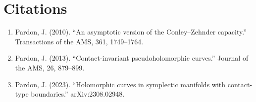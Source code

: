 \section{Citations}

\begin{enumerate}
\item Pardon, J. (2010). ``An asymptotic version of the Conley--Zehnder capacity.'' Transactions of the AMS, 361, 1749--1764.
\item Pardon, J. (2013). ``Contact-invariant pseudoholomorphic curves.'' Journal of the AMS, 26, 879--899.
\item Pardon, J. (2023). ``Holomorphic curves in symplectic manifolds with contact-type boundaries.'' arXiv:2308.02948.
\end{enumerate}
